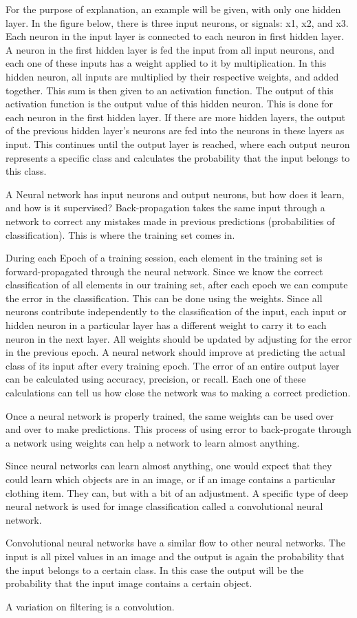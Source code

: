 \documentclass[12pt]{article} %
\begin{document}
For the purpose of explanation, an example will be given, with only one hidden layer. In the figure below, there is three input neurons, or signals: x1, x2, and x3. Each neuron in the input layer is connected to each neuron in first hidden layer. A neuron in the first hidden layer is fed the input from all input neurons, and each one of these inputs has a weight applied to it by multiplication. In this hidden neuron, all inputs are multiplied by their respective weights, and added together. This sum is then given to an activation function. The output of this activation function is the output value of this hidden neuron. This is done for each neuron in the first hidden layer. If there are more hidden layers, the output of the previous hidden layer's neurons are fed into the neurons in these layers as input. This continues until the output layer is reached, where each output neuron represents a specific class and calculates the probability that the input belongs to this class.\cite{KubatMachineLearn}
	
 	A Neural network has input neurons and output neurons, but how does it learn, and how is it supervised? Back-propagation takes the same input through a network to correct any mistakes made in previous predictions (probabilities of classification). This is where the training set comes in. 

During each Epoch of a training session, each element in the training set is forward-propagated through the neural network. Since we know the correct classification of all elements in our training set, after each epoch we can compute the error in the classification. This can be done using the weights. Since all neurons contribute independently to the classification of the input, each input or hidden neuron in a particular layer has a different weight to carry it to each neuron in the next layer. All weights should be updated by adjusting for the error in the previous epoch. A neural network should improve at predicting the actual class of its input after every training epoch. The error of an entire output layer can be calculated using accuracy, precision, or recall. Each one of these calculations can tell us how close the network was to making a correct prediction. 

Once a neural network is properly trained, the same weights can be used over and over to make predictions. This process of using error to back-progate through a network using weights can help a network to learn almost anything.\cite{KubatMachineLearn} 
	
	Since neural networks can learn almost anything, one would expect that they could learn which objects are in an image, or if an image contains a particular clothing item. They can, but with a bit of an adjustment. A specific type of deep neural network is used for image classification called a convolutional neural network. 

Convolutional neural networks have a similar flow to other neural networks. The input is all pixel values in an image and the output is again the probability that the input belongs to a certain class. In this case the output will be the probability that the input image contains a certain object. 
	
	A variation on filtering is a convolution.
\end{document}
